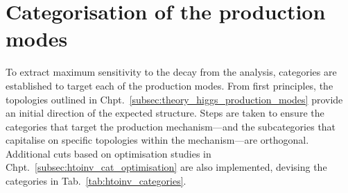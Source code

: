 \section{Categorisation of the production modes}
\label{sec:htoinv_categorisation}


To extract maximum sensitivity to the \higgstoinv decay from the analysis, categories are established to target each of the production modes. From first principles, the topologies outlined in Chpt.~\ref{subsec:theory_higgs_production_modes} provide an initial direction of the expected structure. Steps are taken to ensure the categories that target the production mechanism---and the subcategories that capitalise on specific topologies within the mechanism---are orthogonal. Additional cuts based on optimisation studies in Chpt.~\ref{subsec:htoinv_cat_optimisation} are also implemented, devising the categories in Tab.~\ref{tab:htoinv_categories}.

